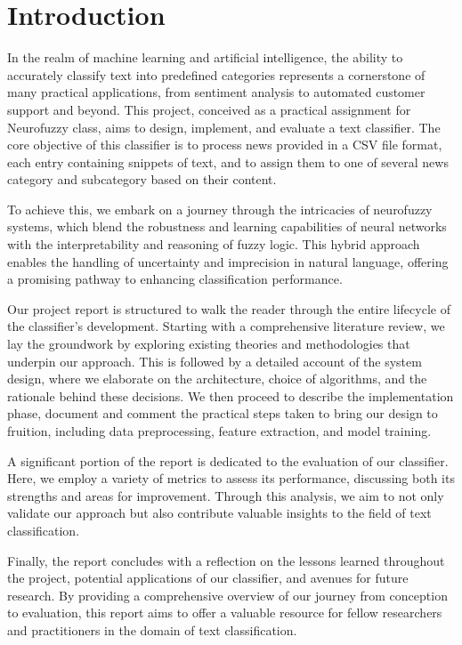 \section{Introduction}

In the realm of machine learning and artificial intelligence, the ability to accurately classify text into predefined categories represents a cornerstone of many practical applications, from sentiment analysis to automated customer support and beyond. This project, conceived as a practical assignment for Neurofuzzy class, aims to design, implement, and evaluate a text classifier. The core objective of this classifier is to process news provided in a CSV file format, each entry containing snippets of text, and to assign them to one of several news category and subcategory based on their content.

To achieve this, we embark on a journey through the intricacies of neurofuzzy systems, which blend the robustness and learning capabilities of neural networks with the interpretability and reasoning of fuzzy logic. This hybrid approach enables the handling of uncertainty and imprecision in natural language, offering a promising pathway to enhancing classification performance.

Our project report is structured to walk the reader through the entire lifecycle of the classifier's development. Starting with a comprehensive literature review, we lay the groundwork by exploring existing theories and methodologies that underpin our approach. This is followed by a detailed account of the system design, where we elaborate on the architecture, choice of algorithms, and the rationale behind these decisions. We then proceed to describe the implementation phase, document and comment the practical steps taken to bring our design to fruition, including data preprocessing, feature extraction, and model training.

A significant portion of the report is dedicated to the evaluation of our classifier. Here, we employ a variety of metrics to assess its performance, discussing both its strengths and areas for improvement. Through this analysis, we aim to not only validate our approach but also contribute valuable insights to the field of text classification.

Finally, the report concludes with a reflection on the lessons learned throughout the project, potential applications of our classifier, and avenues for future research. By providing a comprehensive overview of our journey from conception to evaluation, this report aims to offer a valuable resource for fellow researchers and practitioners in the domain of text classification.